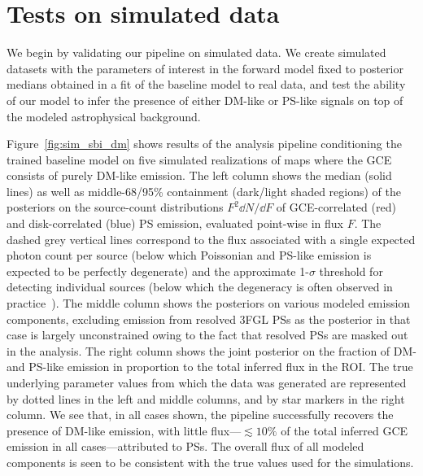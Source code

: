 \documentclass[prd,aps,10pt,nofootinbib,twocolumn,superscriptaddress,preprintnumbers,balancelastpage,longbibliography]{revtex4-1}
\begin{document}
\section{Tests on simulated data}
\label{sec:simulations}

We begin by validating our pipeline on simulated \Fermi data. We create simulated datasets with the parameters of interest in the forward model fixed to posterior medians obtained in a fit of the baseline model to real \Fermi data, and test the ability of our model to infer the presence of either DM-like or PS-like signals on top of the modeled astrophysical background.

Figure~\ref{fig:sim_sbi_dm} shows results of the analysis pipeline conditioning the trained baseline model on five simulated realizations of maps where the GCE consists of purely DM-like emission. The left column shows the median (solid lines) as well as middle-68/95\% containment (dark/light shaded regions) of the posteriors on the source-count distributions $F^2 \dd N/\dd F$ of GCE-correlated (red) and disk-correlated (blue) PS emission, evaluated point-wise in flux $F$. The dashed grey vertical lines correspond to the flux associated with a single expected photon count per source (below which Poissonian and PS-like emission is expected to be perfectly degenerate) and the approximate 1-$\sigma$ threshold for detecting individual sources (below which the degeneracy is often observed in practice~\cite{Chang:2019ars,Buschmann:2020adf}). The middle column shows the posteriors on various modeled emission components, excluding emission from resolved 3FGL PSs as the posterior in that case is largely unconstrained owing to the fact that resolved PSs are masked out in the analysis. The right column shows the joint posterior on the fraction of DM- and PS-like emission in proportion to the total inferred flux in the ROI. The true underlying parameter values from which the data was generated are represented by dotted lines in the left and middle columns, and by star markers in the right column. We see that, in all cases shown, the pipeline successfully recovers the presence of DM-like emission, with little flux---$\lesssim 10\%$ of the total inferred GCE emission in all cases---attributed to PSs. 
The overall flux of all modeled components is seen to be consistent with the true values used for the simulations.
\end{document}
